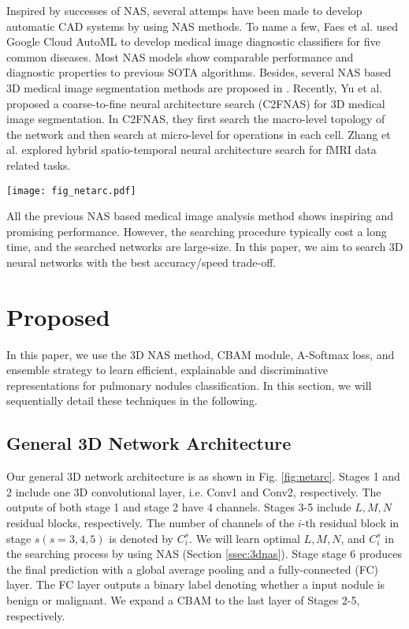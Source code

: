 \documentclass[final,5p,times,twocolumn]{elsarticle}
\begin{document}
Inspired by successes of NAS, several attemps have been made to develop automatic CAD systems by using NAS methods. To name a few, Faes et al. \cite{FAES2019AutoDLmedical} used Google Cloud AutoML to develop medical image diagnostic classifiers for five common diseases. Most NAS models show comparable performance and diagnostic properties to previous SOTA algorithms. Besides, several NAS based 3D medical image segmentation methods are proposed in \cite{kim2019scalable, weng2019nasunet}. Recently, Yu et al. \cite{yu2020c2fnas} proposed a coarse-to-fine neural architecture search (C2FNAS) for 3D medical image segmentation. In C2FNAS, they first search the macro-level topology of the network and then search at micro-level for operations in each cell. Zhang et al. \cite{zhang2019identify} explored hybrid spatio-temporal neural architecture search for fMRI data related tasks. 




\begin{figure*}
\centering
\texttt{[image: fig\_netarc.pdf]} \\
\caption{General 3D network architecture. Here, $L$, $M$ and $N$ are learned in the NAS algorithm.}
\label{fig:netarc}
\end{figure*}

All the previous NAS based medical image analysis method shows inspiring and promising performance. However, the searching procedure typically cost a long time, and the searched networks are large-size. In this paper, we aim to search 3D neural networks with the best accuracy/speed trade-off. 



\section{Proposed}
\label{sec:method}
In this paper, we use the 3D NAS method, CBAM module, A-Softmax loss, and ensemble strategy to learn efficient, explainable and discriminative representations for pulmonary nodules classification.  
In this section, we will sequentially detail these techniques in the following.



\subsection{General 3D Network Architecture}
\label{ssec:netarc}
Our general 3D network architecture is as shown in Fig. \ref{fig:netarc}. 
Stages 1 and 2 include one 3D convolutional layer, i.e. Conv1 and Conv2, respectively. The outputs  of both stage 1 and stage 2 have 4 channels. 
Stages 3-5 include $L, M, N$ residual blocks, respectively. The number of channels of the $i$-th residual block in stage $s (s=3,4,5)$ is denoted by $C^s_i$. We will learn optimal $L, M, N$, and $C^s_i$ in the searching process by using NAS (Section \ref{ssec:3dnas}). 
Stage stage 6 produces the final prediction with a global average pooling and a fully-connected (FC) layer. The FC layer outputs a binary label denoting whether a input nodule is benign or malignant.
We expand a CBAM \citep{Woo2018CBAM} to the last layer of Stages 2-5, respectively. 
\end{document}
